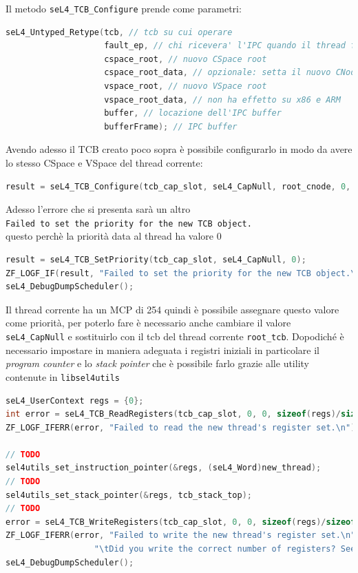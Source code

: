Il metodo \texttt{seL4\_TCB\_Configure} prende come parametri:
\begin{lstlisting}[language=C++]
seL4_Untyped_Retype(tcb, // tcb su cui operare
					fault_ep, // chi ricevera' l'IPC quando il thread fallisce
					cspace_root, // nuovo CSpace root
					cspace_root_data, // opzionale: setta il nuovo CNode
					vspace_root, // nuovo VSpace root
					vspace_root_data, // non ha effetto su x86 e ARM
					buffer, // locazione dell'IPC buffer
					bufferFrame); // IPC buffer
\end{lstlisting} 
Avendo adesso il TCB creato poco sopra è possibile configurarlo in modo da avere lo stesso CSpace e VSpace del thread corrente:
\begin{lstlisting}[language=C++]
result = seL4_TCB_Configure(tcb_cap_slot, seL4_CapNull, root_cnode, 0, root_vspace, 0, (seL4_Word) thread_ipc_buff_sym, tcb_ipc_frame);
\end{lstlisting}
Adesso l'errore che si presenta sarà un altro\\
\texttt{Failed to set the priority for the new TCB object.}\\
questo perchè la priorità data al thread ha valore 0
\begin{lstlisting}[language=C++]
result = seL4_TCB_SetPriority(tcb_cap_slot, seL4_CapNull, 0);
ZF_LOGF_IF(result, "Failed to set the priority for the new TCB object.\n");
seL4_DebugDumpScheduler();
\end{lstlisting}
Il thread corrente ha un MCP di 254 quindi è possibile assegnare questo valore come priorità, per poterlo fare è necessario anche cambiare il valore \texttt{seL4\_CapNull} e sostituirlo con il tcb del thread corrente \texttt{root\_tcb}.
Dopodiché è necessario impostare in maniera adeguata i registri iniziali in particolare il \textit{program counter} e lo \textit{stack pointer} che è possibile farlo grazie alle utility contenute in \texttt{libsel4utils}
\begin{lstlisting}[language=C++]
seL4_UserContext regs = {0};
int error = seL4_TCB_ReadRegisters(tcb_cap_slot, 0, 0, sizeof(regs)/sizeof(seL4_Word), &regs);
ZF_LOGF_IFERR(error, "Failed to read the new thread's register set.\n");

// TODO
sel4utils_set_instruction_pointer(&regs, (seL4_Word)new_thread);
// TODO
sel4utils_set_stack_pointer(&regs, tcb_stack_top);
// TODO
error = seL4_TCB_WriteRegisters(tcb_cap_slot, 0, 0, sizeof(regs)/sizeof(seL4_Word), &regs);
ZF_LOGF_IFERR(error, "Failed to write the new thread's register set.\n"
                  "\tDid you write the correct number of registers? See arg4.\n");
seL4_DebugDumpScheduler();
\end{lstlisting}
